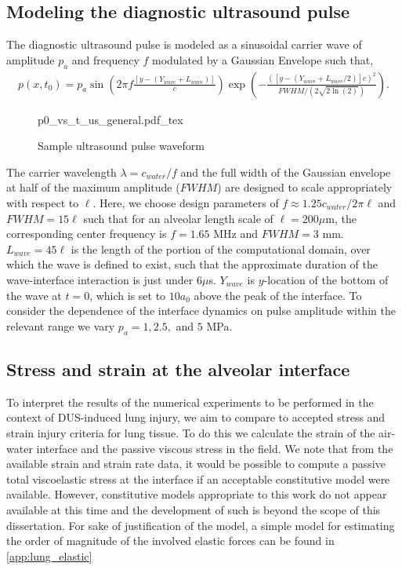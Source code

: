 \subsection{Modeling the diagnostic ultrasound pulse}
The diagnostic ultrasound pulse is modeled as a sinusoidal carrier
wave of amplitude $p_a$ and frequency $f$ modulated by a Gaussian
Envelope such that,
\begin{align}
  p(x,t_0) = p_a\sin{\left(2\pi f\frac{\left[y-\left(Y_{wave}+L_{wave}\right)\right]}{c}\right)}\exp{\left(-\frac{\left(\left[y-\left(Y_{wave}+L_{wave}/2\right)\right]c\right)^2}{FWHM/\left(2\sqrt{2\ln{\left(2\right)}} \right)}\right)}.%
\end{align}
\begin{figure}
  \centering
    \def\svgwidth{0.5\textwidth}
    {p0_vs_t_us_general.pdf_tex}%
    \caption{\label{fig:alveolar_histology} Sample ultrasound pulse waveform}
\end{figure}

The carrier wavelength $\lambda=c_{water}/f$ and the full width of the
Gaussian envelope at half of the maximum amplitude ($FWHM$) are
designed to scale appropriately with respect to $\ell$. Here, we
choose design parameters of $f\approx 1.25 c_{water} / 2\pi \ell$ and
$FWHM=15\ell$ such that for an alveolar length scale of
$\ell=200 \mu$m, the corresponding center frequency is $f=1.65$ MHz
and $FWHM=3$ mm. $L_{wave}=45\ell$ is the length of the portion of the
computational domain, over which the wave is defined to exist, such
that the approximate duration of the wave-interface interaction is
just under $6 \mu$s. $Y_{wave}$ is $y$-location of the bottom of the
wave at $t=0$, which is set to $10a_0$ above the peak of the
interface. To consider the dependence of the interface dynamics on
pulse amplitude within the relevant range we vary $p_a = 1, 2.5,$ and
$5$ MPa.

\subsection{Stress and strain at the alveolar interface}%
\label{subsec:usbe_lung_bio_stress_strain}
To interpret the results of the numerical experiments to be performed
in the context of \ac{DUS}-induced lung injury, we aim to compare to
accepted stress and strain injury criteria for lung tissue. To do this
we calculate the strain of the air-water interface and the passive
viscous stress in the field. We note that from the available strain
and strain rate data, it would be possible to compute a passive total
viscoelastic stress at the interface if an acceptable constitutive
model were available. However, constitutive models appropriate to this
work do not appear available at this time and the development of such is beyond the scope of
this dissertation. For sake of justification of the model, a simple
model for estimating the order of magnitude of the involved elastic
forces can be found in \ref{app:lung_elastic}

